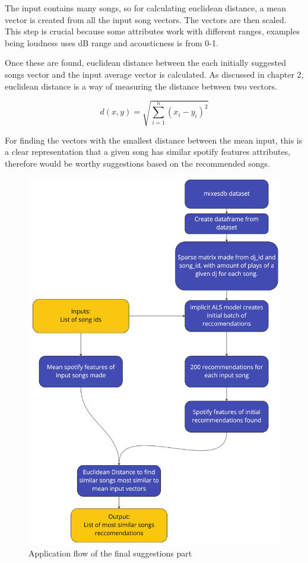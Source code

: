 The input contains many songs, so for calculating euclidean distance, a mean vector is created from all the input song vectors. The vectors are then scaled. This step is crucial because some attributes work with different ranges, examples being loudness uses dB range and acousticness is from 0-1.

Once these are found, euclidean distance between the each initially suggested songs vector and the input average vector is calculated. As discussed in chapter 2, euclidean distance is a way of measuring the distance between two vectors.

\begin{equation}
	d(x,y) = \sqrt{\sum _{i=1} ^{n}(x_{i} - y_{i})^{2}}
\end{equation}

For finding the vectors with the smallest distance between the mean input, this is a clear representation that a given song has similar spotify features attributes, therefore would be worthy suggestions based on the recommended songs.

\begin{figure}[H]
	\includegraphics[scale=0.1]{images/application_app_flow}
	\centering
	\caption{Application flow of the final suggestions part} 
\end{figure}


